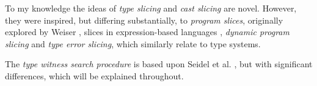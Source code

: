 To my knowledge the ideas of \textit{type slicing} and \textit{cast slicing} are novel. However, they were inspired, but differing substantially, to \textit{program slices}, originally explored by Weiser \cite{ProgSlice}, slices in expression-based languages \cite{FunctionalProgExplain}, \textit{dynamic program slicing} \cite{DynProgSlice} and \textit{type error slicing}\cite{ErrSlice, HaackErrSlice}, which similarly relate to type systems.

The \textit{type witness search procedure} is	 based upon Seidel et al. \cite{SearchProc}, but with significant differences, which will be explained throughout.